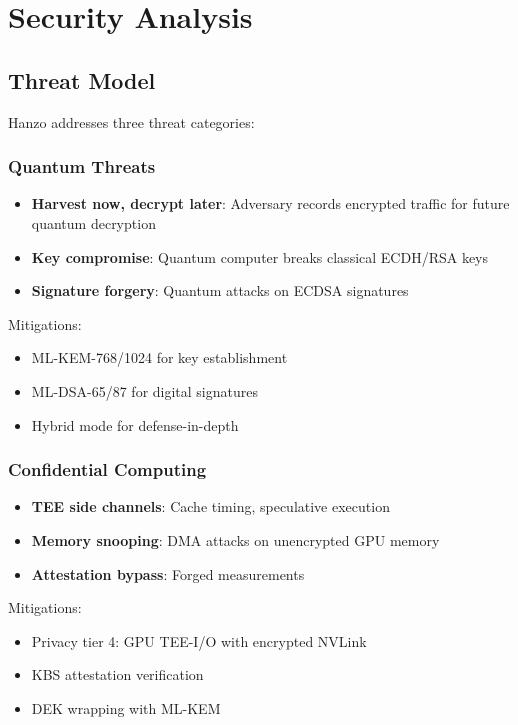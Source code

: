 \documentclass[11pt,twocolumn]{article}
\begin{document}
\section{Security Analysis}

\subsection{Threat Model}

Hanzo addresses three threat categories:

\subsubsection{Quantum Threats}

\begin{itemize}
\item \textbf{Harvest now, decrypt later}: Adversary records encrypted traffic for future quantum decryption
\item \textbf{Key compromise}: Quantum computer breaks classical ECDH/RSA keys
\item \textbf{Signature forgery}: Quantum attacks on ECDSA signatures
\end{itemize}

Mitigations:
\begin{itemize}
\item ML-KEM-768/1024 for key establishment
\item ML-DSA-65/87 for digital signatures
\item Hybrid mode for defense-in-depth
\end{itemize}

\subsubsection{Confidential Computing}

\begin{itemize}
\item \textbf{TEE side channels}: Cache timing, speculative execution
\item \textbf{Memory snooping}: DMA attacks on unencrypted GPU memory
\item \textbf{Attestation bypass}: Forged measurements
\end{itemize}

Mitigations:
\begin{itemize}
\item Privacy tier 4: GPU TEE-I/O with encrypted NVLink
\item KBS attestation verification
\item DEK wrapping with ML-KEM
\end{itemize}
\end{document}
